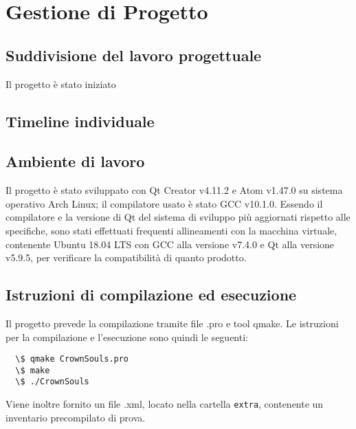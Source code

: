 \section{Gestione di Progetto}

\subsection{Suddivisione del lavoro progettuale}
Il progetto è stato iniziato

\subsection{Timeline individuale}

\subsection{Ambiente di lavoro}
Il progetto è stato sviluppato con Qt Creator v4.11.2 e Atom v1.47.0 su sistema operativo Arch Linux; il compilatore usato è stato GCC v10.1.0. Essendo il compilatore e la versione di Qt del sistema di sviluppo più aggiornati rispetto alle specifiche, sono stati effettuati frequenti allineamenti con la macchina virtuale, contenente Ubuntu 18.04 LTS con GCC alla versione v7.4.0 e Qt alla versione v5.9.5, per verificare la compatibilità di quanto prodotto.

\subsection{Istruzioni di compilazione ed esecuzione}
Il progetto prevede la compilazione tramite file .pro e tool qmake. Le istruzioni per la compilazione e l'esecuzione sono quindi le seguenti:
\begin{verbatim}
  \$ qmake CrownSouls.pro
  \$ make
  \$ ./CrownSouls
\end{verbatim}
Viene inoltre fornito un file .xml, locato nella cartella \texttt{extra}, contenente un inventario precompilato di prova.
